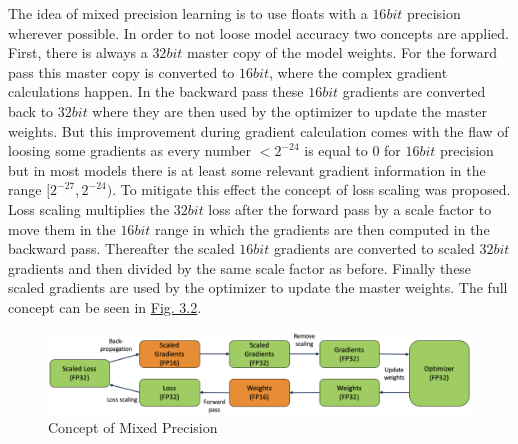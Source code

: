 The idea of mixed precision learning is to use floats with a $16bit$ precision wherever possible. In order to not loose model accuracy two concepts are applied. First, there is always a $32bit$ master copy of the model weights. For the forward pass this master copy is converted to $16bit$, where the complex gradient calculations happen. In the backward pass these $16bit$ gradients are converted back to $32bit$ where they are then used by the optimizer to update the master weights. But this improvement during gradient calculation comes with the flaw of loosing some gradients as every number $<2^{-24}$ is equal to $0$ for $16bit$ precision but in most models there is at least some relevant gradient information in the range $[2^{-27},2^{-24})$. To mitigate this effect the concept of loss scaling was proposed. Loss scaling multiplies the $32bit$ loss after the forward pass by a scale factor to move them in the $16bit$ range in which the gradients are then computed in the backward pass. Thereafter the scaled $16bit$ gradients are converted to scaled $32bit$ gradients and then divided by the same scale factor as before. Finally these scaled gradients are used by the optimizer to update the master weights. The full concept can be seen in \hyperref[fig:3.2]{Fig. 3.2}.
%
\begin{figure}[] \label{fig:3.2}
    \centering
    \includegraphics[width=.9\textwidth]{Chapters/figures/mixed_prec.PNG}
    \caption[Short-form caption]{Concept of Mixed Precision}
\end{figure}
%


